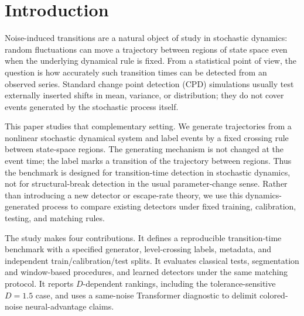 ﻿\section{Introduction}

Noise-induced transitions are a natural object of study in stochastic dynamics:
random fluctuations can move a trajectory between regions of state space even
when the underlying dynamical rule is fixed. From a statistical point of view,
the question is how accurately such transition times can be detected from an
observed series. Standard change point detection (CPD) simulations usually test
externally inserted shifts in mean, variance, or distribution; they do not cover
events generated by the stochastic process itself.

This paper studies that complementary setting. We generate trajectories from a
nonlinear stochastic dynamical system and label events by a fixed crossing rule
between state-space regions. The generating mechanism is not changed at the
event time; the label marks a transition of the trajectory between regions.
Thus the benchmark is designed for transition-time detection in stochastic
dynamics, not for structural-break detection in the usual parameter-change
sense. Rather than introducing a new detector or escape-rate theory, we use this
dynamics-generated process to compare existing detectors under fixed training,
calibration, testing, and matching rules.

The study makes four contributions. It defines a reproducible transition-time
benchmark with a specified generator, level-crossing labels, metadata, and
independent train/calibration/test splits. It evaluates classical tests,
segmentation and window-based procedures, and learned detectors under the same
matching protocol. It reports \(D\)-dependent rankings, including the
tolerance-sensitive \(D=1.5\) case, and uses a same-noise Transformer diagnostic
to delimit colored-noise neural-advantage claims.

